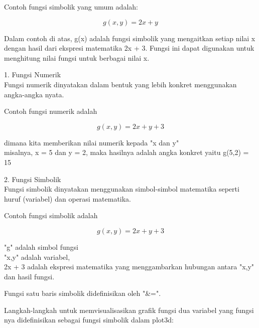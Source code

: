 \documentclass[a4paper,10pt]{article}
\begin{document}
\begin{eulernotebook}
\begin{eulercomment}
\begin{eulercomment}
\begin{eulercomment}
\begin{eulercomment}
\begin{eulercomment}
\begin{eulercomment}
\begin{eulercomment}
\begin{eulercomment}
\begin{eulercomment}
Contoh fungsi simbolik yang umum adalah:

\end{eulercomment}
\begin{eulerformula}
\[
g(x,y) = 2x + y
\]
\end{eulerformula}
\begin{eulercomment}
Dalam contoh di atas, g(x) adalah fungsi simbolik yang mengaitkan
setiap nilai x dengan hasil dari ekspresi matematika 2x + 3. Fungsi
ini dapat digunakan untuk menghitung nilai fungsi untuk berbagai nilai
x.

\end{eulercomment}
\begin{eulercomment}
1. Fungsi Numerik\\
Fungsi numerik dinyatakan dalam bentuk yang lebih konkret menggunakan
angka-angka nyata.

Contoh fungsi numerik adalah

\end{eulercomment}
\begin{eulerformula}
\[
g(x,y) = 2x + y + 3
\]
\end{eulerformula}
\begin{eulercomment}
dimana kita memberikan nilai numerik kepada "x dan y"\\
misalnya, x = 5 dan y = 2, maka hasilnya adalah angka konkret yaitu
g(5,2) = 15

2. Fungsi Simbolik\\
Fungsi simbolik dinyatakan menggunakan simbol-simbol matematika
seperti huruf (variabel) dan operasi matematika.

Contoh fungsi simbolik adalah

\end{eulercomment}
\begin{eulerformula}
\[
g(x,y) = 2x + y + 3
\]
\end{eulerformula}
\begin{eulercomment}
"g" adalah simbol fungsi\\
"x,y" adalah variabel,\\
2x + 3 adalah ekspresi matematika yang menggambarkan hubungan antara
"x,y" dan hasil fungsi.

\end{eulercomment}
\begin{eulercomment}
Fungsi satu baris simbolik didefinisikan oleh "\&=".

Langkah-langkah untuk memvisualisasikan grafik fungsi dua variabel
yang fungsi nya didefinisikan sebagai fungsi simbolik dalam plot3d:


\end{eulercomment}
\end{eulercomment}
\end{eulercomment}
\end{eulercomment}
\end{eulercomment}
\end{eulercomment}
\end{eulercomment}
\end{eulercomment}
\end{eulercomment}
\end{eulernotebook}
\end{document}
